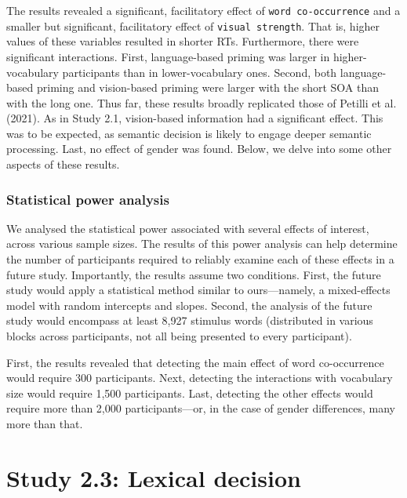 \documentclass[
  12pt,
  man,floatsintext]{apa7}
\begin{document}
The results revealed a significant, facilitatory effect of \texttt{word\ co-occurrence} and a smaller but significant, facilitatory effect of \texttt{visual\ strength}. That is, higher values of these variables resulted in shorter RTs. Furthermore, there were significant interactions. First, language-based priming was larger in higher-vocabulary participants than in lower-vocabulary ones. Second, both language-based priming and vision-based priming were larger with the short SOA than with the long one. Thus far, these results broadly replicated those of Petilli et al. (2021). As in Study 2.1, vision-based information had a significant effect. This was to be expected, as semantic decision is likely to engage deeper semantic processing. Last, no effect of gender was found. Below, we delve into some other aspects of these results.

\hypertarget{statistical-power-analysis-5}{%
\subsubsection{Statistical power analysis}\label{statistical-power-analysis-5}}

We analysed the statistical power associated with several effects of interest, across various sample sizes. The results of this power analysis can help determine the number of participants required to reliably examine each of these effects in a future study. Importantly, the results assume two conditions. First, the future study would apply a statistical method similar to ours---namely, a mixed-effects model with random intercepts and slopes. Second, the analysis of the future study would encompass at least 8,927 stimulus words (distributed in various blocks across participants, not all being presented to every participant).

First, the results revealed that detecting the main effect of word co-occurrence would require 300 participants. Next, detecting the interactions with vocabulary size would require 1,500 participants. Last, detecting the other effects would require more than 2,000 participants---or, in the case of gender differences, many more than that.

\clearpage

\hypertarget{lexicaldecision}{%
\section{Study 2.3: Lexical decision}\label{lexicaldecision}}
\end{document}
